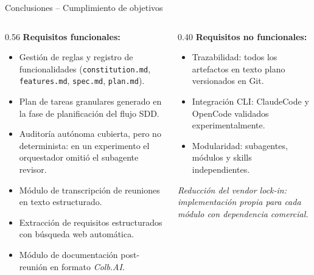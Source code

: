 \documentclass[t]{beamer}
\begin{document}
\begin{frame}{Conclusiones -- Cumplimiento de objetivos}
    \vspace{-0.5cm}
    \begin{columns}[T]
        \begin{column}{0.56\textwidth}
            \textbf{Requisitos funcionales:}
            \vspace{0.1cm}
            \begin{itemize}
                \footnotesize
                \item Gestión de reglas y registro de funcionalidades (\texttt{constitution.md}, \texttt{features.md}, \texttt{spec.md}, \texttt{plan.md}).
                \item Plan de tareas granulares generado en la fase de planificación del flujo SDD.
                \item[*] Auditoría autónoma cubierta, pero no determinista: en un experimento el orquestador omitió el subagente revisor.
                \item Módulo de transcripción de reuniones en texto estructurado.
                \item Extracción de requisitos estructurados con búsqueda web automática.
                \item Módulo de documentación post-reunión en formato \textit{Colb.AI}.
            \end{itemize}
        \end{column}
        \begin{column}{0.40\textwidth}
            \textbf{Requisitos no funcionales:}
            \vspace{0.1cm}
            \begin{itemize}
                \footnotesize
                \item Trazabilidad: todos los artefactos en texto plano versionados en Git.
                \item Integración CLI: ClaudeCode y OpenCode validados experimentalmente.
                \item Modularidad: subagentes, módulos y skills independientes.
            \end{itemize}
            \vspace{0.2cm}
            \footnotesize\textit{Reducción del \textit{vendor lock-in}: implementación propia para cada módulo con dependencia comercial.}
        \end{column}
    \end{columns}
\end{frame}
\end{document}
